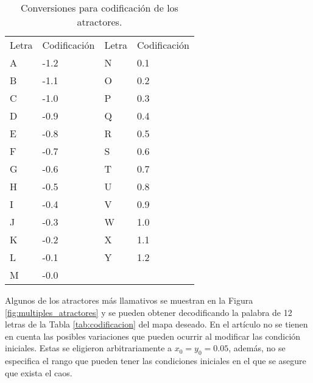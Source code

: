         \begin{table}[htbp]
            \centering
            \caption{Conversiones para codificación de los atractores.}
            \begin{tabular}{|l|l|l|l|}
                \hline
                \rowcolor{lightgray}   Letra & Codificación & Letra & Codificación\\
                A & -1.2 & N & 0.1 \\ 
                \hline
                B & -1.1 & O & 0.2 \\ 
                \hline
                C & -1.0 & P & 0.3 \\ 
                \hline
                D & -0.9 & Q & 0.4 \\ 
                \hline
                E & -0.8 & R & 0.5 \\ 
                \hline
                F & -0.7 & S & 0.6 \\ 
                \hline
                G & -0.6 & T & 0.7 \\ 
                \hline
                H & -0.5 & U & 0.8 \\ 
                \hline
                I & -0.4 & V & 0.9 \\ 
                \hline
                J & -0.3 & W & 1.0 \\ 
                \hline
                K & -0.2 & X & 1.1 \\ 
                \hline
                L & -0.1 & Y & 1.2 \\ 
                \hline
                M & -0.0 &   &     \\ 
                \hline
            \end{tabular}
            \label{tab:conversion_mapas}
        \end{table}

        Algunos de los atractores más llamativos se muestran en la Figura \ref{fig:multiples_atractores} y se pueden obtener decodificando la palabra de 12 letras de la Tabla \ref{tab:codificacion} del mapa deseado. En el artículo \cite{Sprott1993} no se tienen en cuenta las posibles variaciones que pueden ocurrir al modificar las condición iniciales. Estas se eligieron arbitrariamente a $x_{0} = y_{0} = 0.05$, además, no se especifica el rango que pueden tener las condiciones iniciales en el que se asegure que exista el caos.

